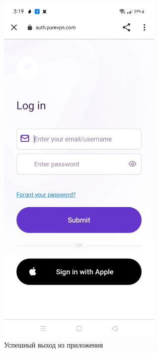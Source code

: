 \begin{itemize}
\begin{figure}[H]
\includegraphics[width=8cm]{34.png}
\centering
\caption{Успешный выход из приложения}
\label{fig:52}
\end{figure}
\end{itemize}

